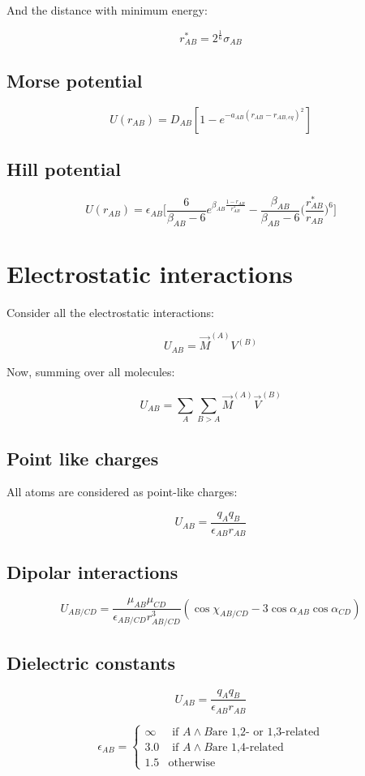 	And the distance with minimum energy:

	$$r^*_{AB} = 2^{\frac{1}{6}}\sigma_{AB}$$

	\subsection{Morse potential}

	$$U(r_{AB}) = D_{AB}[1-e^{-a_{AB}(r_{AB}-r_{AB,eq})^2}]$$

	\subsection{Hill potential}

	$$U(r_{AB}) = \epsilon_{AB}\biggl[\frac{6}{\beta_{AB}-6}e^{\beta_{AB}\frac{1-r_{AB}}{r^*_{AB}}}-\frac{\beta_{AB}}{\beta_{AB}-6}\biggl(\frac{r^*_{AB}}{r_{AB}}\biggr)^6\biggr]$$


\section{Electrostatic interactions}
Consider all the electrostatic interactions:

$$U_{AB} = \vec{M}^{(A)}V^{(B)}$$

Now, summing over all molecules:

$$U_{AB} = \sum\limits_{A}\sum\limits_{B>A}\vec{M}^{(A)}\vec{V}^{(B)}$$

	\subsection{Point like charges}
	All atoms are considered as point-like charges:

	$$U_{AB} = \frac{q_Aq_B}{\epsilon_{AB}r_{AB}}$$

	\subsection{Dipolar interactions}

	$$U_{AB/CD} = \frac{\mu_{AB}\mu_{CD}}{\epsilon_{AB/CD}r^3_{AB/CD}}(\cos\chi_{AB/CD}-3\cos\alpha_{AB}\cos\alpha_{CD})$$

	\subsection{Dielectric constants}

	$$U_{AB} = \frac{q_Aq_B}{\epsilon_{AB}r_{AB}}$$

	$$\epsilon_{AB} = \begin{cases}\infty&\text{ if }A\land B\text{are 1,2- or 1,3-related}\\3.0&\text{ if }A\land B\text{are 1,4-related}\\1.5&\text{otherwise}\end{cases}$$

